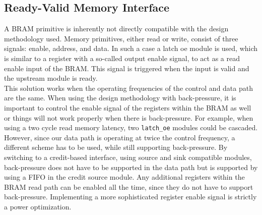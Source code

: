 \subsection{Ready-Valid Memory Interface}
\label{sec:rvmem}
A BRAM primitive is inherently not directly compatible with the design methodology used. Memory primitives, either read or write, consist of three signals: enable, address, and data. In such a case a latch oe module is used, which is similar to a register with a so-called output enable signal, to act as a read enable input of the BRAM. This signal is triggered when the input is valid and the upstream module is ready.\\
This solution works when the operating frequencies of the control and data path are the same. When using the design methodology with back-pressure, it is important to control the enable signal of the registers within the BRAM as well or things will not work properly when there is back-pressure. For example, when using a two cycle read memory latency, two \texttt{latch\_oe} modules could be cascaded. However, since our data path is operating at twice the control frequency, a different scheme has to be used, while still supporting back-pressure. By switching to a credit-based interface, using source and sink compatible modules, back-pressure does not have to be supported in the data path but is supported by using a FIFO in the credit source module. Any additional registers within the BRAM read path can be enabled all the time, since they do not have to support back-pressure. Implementing a more sophisticated register enable signal is strictly a power optimization.

